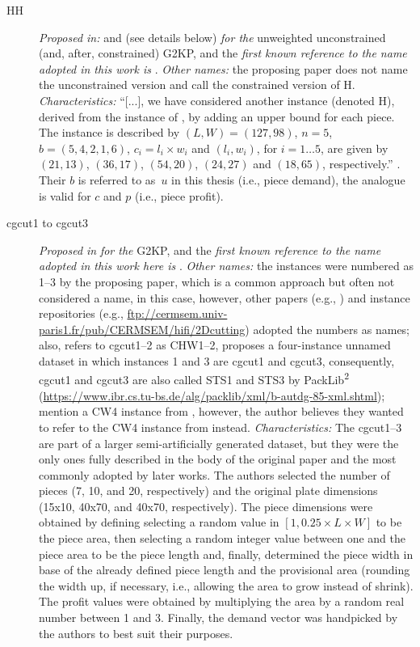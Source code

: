 \documentclass[ppgc,tese,english,formais,babel]{iiufrgs}
\begin{document}
\begin{description}
\item [HH] \emph{Proposed in:} \citet{herz:1972} and \citet{hifi:1997} (see details below) \emph{for the} unweighted unconstrained (and, after, constrained) G2KP, and the \emph{first known reference to the name adopted in this work is} \citet{cung:2000}. \emph{Other names:} the proposing paper does not name the unconstrained version and \citet{hifi:1997} call the constrained version of H. \emph{Characteristics: } ``[...], we have considered another instance (denoted H), derived from the instance of \citet{herz:1972}, by adding an upper bound for each piece. The instance is described by \((L, W) = (127, 98)\), \(n = 5\), \(b = (5, 4, 2, 1, 6)\), \(c_i = l_i \times w_i\) and \((l_i, w_i)\), for \(i = 1 \dots 5\), are given by \((21, 13)\), \((36, 17)\), \((54, 20)\), \((24, 27)\) and \((18, 65)\), respectively.'' \citep{hifi:1997}. Their \(b\) is referred to as~\(u\) in this thesis (i.e., piece demand), the analogue is valid for \(c\) and \(p\) (i.e., piece profit).
\item [cgcut1 to cgcut3] \emph{Proposed in} \citet{cw:1977} \emph{for the} G2KP, and the \emph{first known reference to the name adopted in this work here is} \citet{martello:1998}. \emph{Other names:} the instances were numbered as 1--3 by the proposing paper, which is a common approach but often not considered a name, in this case, however, other papers (e.g., \citet{hifi:1997}) and instance repositories (e.g., \url{ftp://cermsem.univ-paris1.fr/pub/CERMSEM/hifi/2Dcutting}) adopted the numbers as names; also, \citet{fayard:1998} refers to cgcut1--2 as CHW1--2, \citet{tschoke:1995} proposes a four-instance unnamed dataset in which instances 1 and 3 are cgcut1 and cgcut3, consequently, cgcut1 and cgcut3 are also called STS1 and STS3 by PackLib\textsuperscript{2} (\url{https://www.ibr.cs.tu-bs.de/alg/packlib/xml/b-autdg-85-xml.shtml}); \citet{velasco:2019} mention a CW4 instance from \citet{cw:1977}, however, the author believes they wanted to refer to the CW4 instance from \citet{fayard:1998} instead. \emph{Characteristics:} The cgcut1--3 are part of a larger semi-artificially generated dataset, but they were the only ones fully described in the body of the original paper and the most commonly adopted by later works. The authors selected the number of pieces (7, 10, and 20, respectively) and the original plate dimensions (15x10, 40x70, and 40x70, respectively). The piece dimensions were obtained by defining selecting a random value in \([1, 0.25\times L \times W]\) to be the piece area, then selecting a random integer value between one and the piece area to be the piece length and, finally, determined the piece width in base of the already defined piece length and the provisional area (rounding the width up, if necessary, i.e., allowing the area to grow instead of shrink). The profit values were obtained by multiplying the area by a random real number between 1 and 3. Finally, the demand vector was handpicked by the authors to best suit their purposes.

\end{description}
\end{document}
